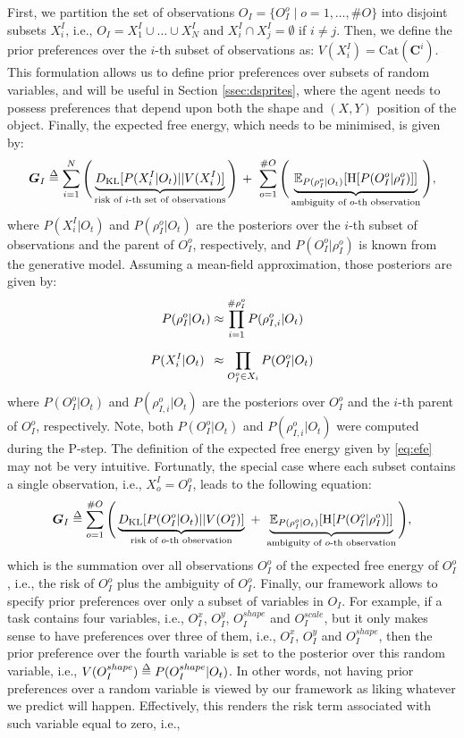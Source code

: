 \documentclass[twoside,11pt]{article}
\def\delequal{\mathrel{\ensurestackMath{\stackon[1pt]{=}{\scriptstyle\Delta}}}}
\newcommand{\nb}[1]{\# #1}
\begin{document}
First, we partition the set of observations $O_I = \{O_I^o \mid o = 1, \hdots, \nb{O}\}$ into disjoint subsets $X_i^I$, i.e., $O_I = X_1^I \cup \hdots \cup X_N^I$ and $X_i^I \cap X_j^I = \emptyset$ if $i \neq j$. Then, we define the prior preferences over the $i$-th subset of observations as: $V(X_i^I) = \text{Cat}(\bm{C}^i)$. This formulation allows us to define prior preferences over subsets of random variables, and will be useful in Section \ref{ssec:dsprites}, where the agent needs to possess preferences that depend upon both the shape and $(X, Y)$ position of the object. Finally, the expected free energy, which needs to be minimised, is given by:
\begin{align}\label{eq:efe}
\bm{G}_I \delequal \sum_{i=1}^{N} \Bigg( \underbrace{D_{\mathrm{KL}}[P(X_i^I|O_t)||V(X_i^I)]}_{\text{risk of } i \text{-th set of observations}}\Bigg)\, +\,\, \sum_{o=1}^{\nb{O}} \Bigg( \underbrace{\mathbb{E}_{P(\rho_I^o|O_t)}[\text{H}[P(O_I^o | \rho_I^o)]]}_{\text{ambiguity of } o \text{-th observation}}\Bigg),
\end{align}
where $P(X_i^I|O_t)$ and $P(\rho_I^o|O_t)$ are the posteriors over the $i$-th subset of observations and the parent of $O_I^o$, respectively, and $P(O_I^o | \rho_I^o)$ is known from the generative model. Assuming a mean-field approximation, those posteriors are given by:
\begin{align*}
P(\rho_I^o|O_t) &\approx \prod_{i = 1}^{\nb{\rho_I^o}} P(\rho_{I,i}^o|O_t)\\
P(X_i^I|O_t) \,\,\, &\approx \prod_{O_I^o \in X_i}^{{\color{white}x}} P(O_I^o|O_t)
\end{align*}
where $P(O_I^o|O_t)$ and $P(\rho_{I,i}^o|O_t)$ are the posteriors over $O_I^o$ and the $i$-th parent of $O_I^o$, respectively. Note, both $P(O_I^o|O_t)$ and $P(\rho_{I,i}^o|O_t)$ were computed during the P-step. The definition of the expected free energy given by \eqref{eq:efe} may not be very intuitive. Fortunatly, the special case where each subset contains a single observation, i.e., $X_o^I = O_I^o$, leads to the following equation:
\begin{align*}
\bm{G}_I \delequal \sum_{o=1}^{\nb{O}} \Bigg( \underbrace{D_{\mathrm{KL}}[P(O_I^o|O_t)||V(O_I^o)]}_{\text{risk of } o \text{-th observation}} \,\, +\,\, \underbrace{\mathbb{E}_{P(\rho_I^o|O_t)}[\text{H}[P(O_I^o | \rho_I^o)]]}_{\text{ambiguity of } o \text{-th observation}}\Bigg),
\end{align*}
which is the summation over all observations $O_I^o$ of the expected free energy of $O_I^o$, i.e., the risk of $O_I^o$ plus the ambiguity of $O_I^o$. Finally, our framework allows to specify prior preferences over only a subset of variables in $O_I$. For example, if a task contains four variables, i.e., $O_I^x$, $O_I^y$, $O_I^{shape}$ and $O_I^{scale}$, but it only makes sense to have preferences over three of them, i.e., $O_I^x$, $O_I^y$ and $O_I^{shape}$, then the prior preference over the fourth variable is set to the posterior over this random variable, i.e., $V(O_I^{shape}) \delequal P(O_I^{shape}|O_t)$. In other words, not having prior preferences over a random variable is viewed by our framework as liking whatever we predict will happen. Effectively, this renders the risk term associated with such variable equal to zero, i.e., 
\end{document}
